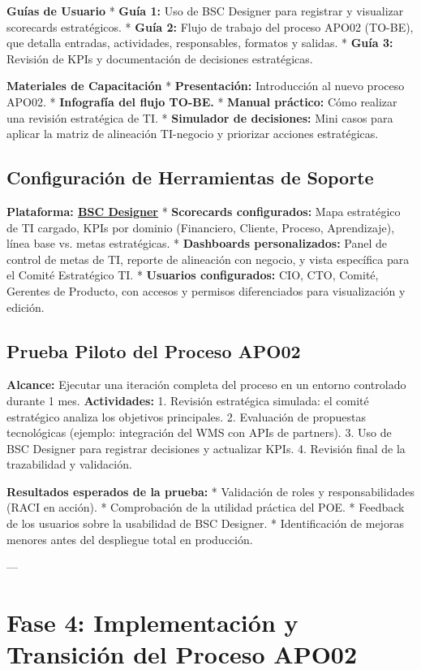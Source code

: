\documentclass[11pt]{article}
\begin{document}
\textbf{Guías de Usuario}
* \textbf{Guía 1:} Uso de BSC Designer para registrar y visualizar scorecards estratégicos.
* \textbf{Guía 2:} Flujo de trabajo del proceso APO02 (TO-BE), que detalla entradas, actividades, responsables, formatos y salidas.
* \textbf{Guía 3:} Revisión de KPIs y documentación de decisiones estratégicas.

\textbf{Materiales de Capacitación}
* \textbf{Presentación:} Introducción al nuevo proceso APO02.
* \textbf{Infografía del flujo TO-BE.}
* \textbf{Manual práctico:} Cómo realizar una revisión estratégica de TI.
* \textbf{Simulador de decisiones:} Mini casos para aplicar la matriz de alineación TI-negocio y priorizar acciones estratégicas.

\subsection{Configuración de Herramientas de Soporte}
\textbf{Plataforma: \href{https://bscdesigner.com}{BSC Designer}}
* \textbf{Scorecards configurados:} Mapa estratégico de TI cargado, KPIs por dominio (Financiero, Cliente, Proceso, Aprendizaje), línea base vs. metas estratégicas.
* \textbf{Dashboards personalizados:} Panel de control de metas de TI, reporte de alineación con negocio, y vista específica para el Comité Estratégico TI.
* \textbf{Usuarios configurados:} CIO, CTO, Comité, Gerentes de Producto, con accesos y permisos diferenciados para visualización y edición.

\subsection{Prueba Piloto del Proceso APO02}
\textbf{Alcance:} Ejecutar una iteración completa del proceso en un entorno controlado durante 1 mes.
\textbf{Actividades:}
1. Revisión estratégica simulada: el comité estratégico analiza los objetivos principales.
2. Evaluación de propuestas tecnológicas (ejemplo: integración del WMS con APIs de partners).
3. Uso de BSC Designer para registrar decisiones y actualizar KPIs.
4. Revisión final de la trazabilidad y validación.

\textbf{Resultados esperados de la prueba:}
* Validación de roles y responsabilidades (RACI en acción).
* Comprobación de la utilidad práctica del POE.
* Feedback de los usuarios sobre la usabilidad de BSC Designer.
* Identificación de mejoras menores antes del despliegue total en producción.

---

\section{Fase 4: Implementación y Transición del Proceso APO02}
\end{document}
